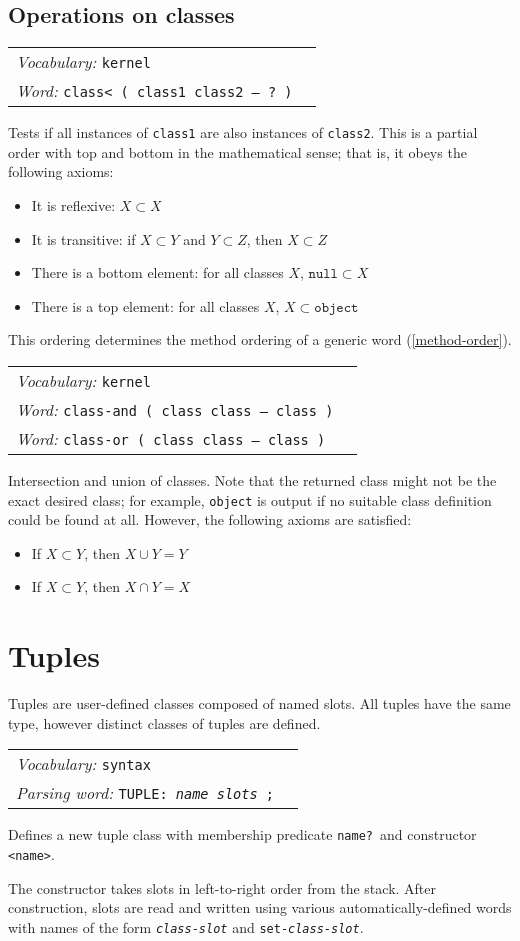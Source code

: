 \documentclass{book}
\newcommand{\vocabulary}[1]{\emph{Vocabulary:} \texttt{#1}&\\}
\newcommand{\parsingword}[2]{\index{\texttt{#1}}\emph{Parsing word:} \texttt{#2}&\\}
\newcommand{\ordinaryword}[2]{\index{\texttt{#1}}\emph{Word:} \texttt{#2}&\\}
\newcommand{\wordtable}[1]{


\begin{tabularx}{12cm}{lX}
\hline
#1
\hline
\end{tabularx}

}
\begin{document}
\subsection{Operations on classes}
\wordtable{
\vocabulary{kernel}
\ordinaryword{class<}{class< ( class1 class2 -- ?~)}
}
Tests if all instances of \verb|class1| are also instances of \verb|class2|. This is a partial order with top and bottom in the mathematical sense; that is, it obeys the following axioms:
\begin{itemize}
\item It is reflexive: $X\subset X$
\item It is transitive: if $X\subset Y$ and $Y\subset Z$, then $X\subset Z$
\item There is a bottom element: for all classes $X$, $\texttt{null}\subset X$
\item There is a top element: for all classes $X$, $X\subset\texttt{object}$
\end{itemize}

This ordering determines the method ordering of a generic word (\ref{method-order}).

\wordtable{
\vocabulary{kernel}
\ordinaryword{class-and}{class-and ( class class -- class )}
\ordinaryword{class-or}{class-or ( class class -- class )}

}
Intersection and union of classes. Note that the returned class might not be the exact desired class; for example, \texttt{object} is output if no suitable class definition could be found at all. However, the following axioms are satisfied:
\begin{itemize}
\item If $X\subset Y$, then $X\cup Y=Y$
\item If $X\subset Y$, then $X\cap Y=X$
\end{itemize}

\section{Tuples}\label{tuples}
\tupleglos

Tuples are user-defined classes composed of named slots. All tuples have the same type, however distinct classes of tuples are defined.
\wordtable{
\vocabulary{syntax}
\parsingword{TUPLE:}{TUPLE: \emph{name} \emph{slots} ;}
}
Defines a new tuple class with membership predicate \texttt{name?}~and constructor \texttt{<name>}.

The constructor takes slots in left-to-right order from the stack. After construction, slots are read and written using various automatically-defined words with names of the
form \texttt{\emph{class}-\emph{slot}} and \texttt{set-\emph{class}-\emph{slot}}.
\end{document}
